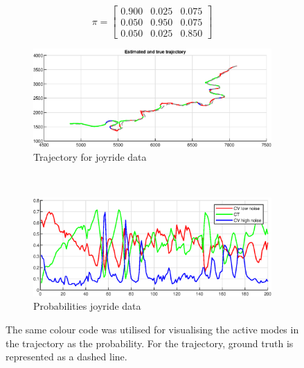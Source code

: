\begin{equation}
    \label{eq:ga_1_joyride_pi_matrix}
    \pi = \begin{bmatrix}
        0.900 & 0.025 & 0.075 \\
        0.050 & 0.950 & 0.075 \\
        0.050 & 0.025 & 0.850 
    \end{bmatrix}
\end{equation}

\begin{figure}[ht]
    \centering
    \begin{subfigure}[h]{0.35\textwidth}
        \includegraphics[width=\textwidth]{figures/ga_1/joyride_estimated_trajectory}
        \caption{Trajectory for joyride data}
        \label{fig:ga_1_joyride_estimated_trajectory}
    \end{subfigure}%
    ~
    \begin{subfigure}[h]{0.35\textwidth}
        \includegraphics[width=\textwidth]{figures/ga_1/joyride_probs}
        \caption{Probabilities joyride data}
        \label{fig:ga_1_joyride_probabilities}
    \end{subfigure}
    \caption{The same colour code was utilised for visualising the active modes in the trajectory as the probability. For the trajectory, ground truth is represented as a dashed line. }
    \label{fig:ga_1_joyride_traj_and_probs} 
\end{figure}

